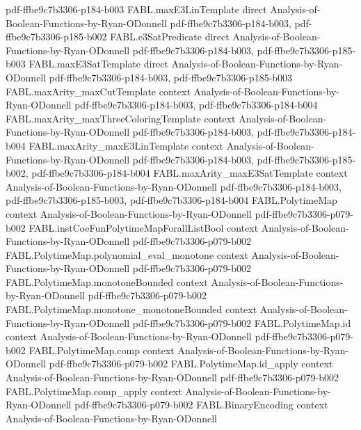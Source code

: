 \begin{theorem}
  {pdf-ffbe9c7b3306-p184-b003}
\proofstep
  {FABL.maxE3LinTemplate}
  {direct}
  {Analysis-of-Boolean-Functions-by-Ryan-ODonnell}
  {pdf-ffbe9c7b3306-p184-b003,
    pdf-ffbe9c7b3306-p185-b002}
\proofstep
  {FABL.e3SatPredicate}
  {direct}
  {Analysis-of-Boolean-Functions-by-Ryan-ODonnell}
  {pdf-ffbe9c7b3306-p184-b003,
    pdf-ffbe9c7b3306-p185-b003}
\proofstep
  {FABL.maxE3SatTemplate}
  {direct}
  {Analysis-of-Boolean-Functions-by-Ryan-ODonnell}
  {pdf-ffbe9c7b3306-p184-b003,
    pdf-ffbe9c7b3306-p185-b003}
\proofstep
  {FABL.maxArity_maxCutTemplate}
  {context}
  {Analysis-of-Boolean-Functions-by-Ryan-ODonnell}
  {pdf-ffbe9c7b3306-p184-b003,
    pdf-ffbe9c7b3306-p184-b004}
\proofstep
  {FABL.maxArity_maxThreeColoringTemplate}
  {context}
  {Analysis-of-Boolean-Functions-by-Ryan-ODonnell}
  {pdf-ffbe9c7b3306-p184-b003,
    pdf-ffbe9c7b3306-p184-b004}
\proofstep
  {FABL.maxArity_maxE3LinTemplate}
  {context}
  {Analysis-of-Boolean-Functions-by-Ryan-ODonnell}
  {pdf-ffbe9c7b3306-p184-b003,
    pdf-ffbe9c7b3306-p185-b002,
    pdf-ffbe9c7b3306-p184-b004}
\proofstep
  {FABL.maxArity_maxE3SatTemplate}
  {context}
  {Analysis-of-Boolean-Functions-by-Ryan-ODonnell}
  {pdf-ffbe9c7b3306-p184-b003,
    pdf-ffbe9c7b3306-p185-b003,
    pdf-ffbe9c7b3306-p184-b004}
\proofstep
  {FABL.PolytimeMap}
  {context}
  {Analysis-of-Boolean-Functions-by-Ryan-ODonnell}
  {pdf-ffbe9c7b3306-p079-b002}
\proofstep
  {FABL.instCoeFunPolytimeMapForallListBool}
  {context}
  {Analysis-of-Boolean-Functions-by-Ryan-ODonnell}
  {pdf-ffbe9c7b3306-p079-b002}
\proofstep
  {FABL.PolytimeMap.polynomial_eval_monotone}
  {context}
  {Analysis-of-Boolean-Functions-by-Ryan-ODonnell}
  {pdf-ffbe9c7b3306-p079-b002}
\proofstep
  {FABL.PolytimeMap.monotoneBounded}
  {context}
  {Analysis-of-Boolean-Functions-by-Ryan-ODonnell}
  {pdf-ffbe9c7b3306-p079-b002}
\proofstep
  {FABL.PolytimeMap.monotone_monotoneBounded}
  {context}
  {Analysis-of-Boolean-Functions-by-Ryan-ODonnell}
  {pdf-ffbe9c7b3306-p079-b002}
\proofstep
  {FABL.PolytimeMap.id}
  {context}
  {Analysis-of-Boolean-Functions-by-Ryan-ODonnell}
  {pdf-ffbe9c7b3306-p079-b002}
\proofstep
  {FABL.PolytimeMap.comp}
  {context}
  {Analysis-of-Boolean-Functions-by-Ryan-ODonnell}
  {pdf-ffbe9c7b3306-p079-b002}
\proofstep
  {FABL.PolytimeMap.id_apply}
  {context}
  {Analysis-of-Boolean-Functions-by-Ryan-ODonnell}
  {pdf-ffbe9c7b3306-p079-b002}
\proofstep
  {FABL.PolytimeMap.comp_apply}
  {context}
  {Analysis-of-Boolean-Functions-by-Ryan-ODonnell}
  {pdf-ffbe9c7b3306-p079-b002}
\proofstep
  {FABL.BinaryEncoding}
  {context}
  {Analysis-of-Boolean-Functions-by-Ryan-ODonnell}

\end{theorem}
